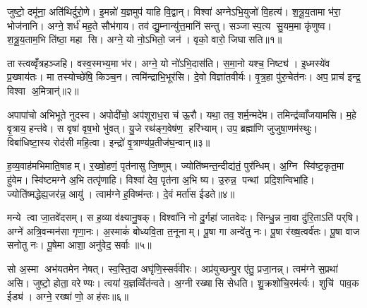 

\clearpage
{}
\setcounter{anuvakam}{0}
जुष्टो॒ दमू॑ना॒ अति॑थिर्दुरो॒णे। इ॒मन्नो॑ य॒ज्ञमुप॑ याहि वि॒द्वान्। विश्वा॑ अग्नेऽभि॒युजो॑ वि॒हत्य॑। श॒त्रू॒य॒तामा भ॑रा॒ भोज॑नानि। अग्ने॒ शर्ध॑ मह॒ते सौभ॑गाय। तव॑ द्यु॒म्नान्यु॑त्त॒मानि॑ सन्तु। सञ्जास्प॒त्य सु॒यम॒मा कृ॑णुष्व। श॒त्रू॒य॒ताम॒भि ति॑ष्ठा॒ महा सि। अग्ने॒ यो नो॒ऽभितो॒ जन॑। वृको॒ वारो॒ जिघासति॥१॥

तास्त्वव्वृँ॑त्रहञ्जहि। वस्व॒स्मभ्य॒मा भ॑र। अग्ने॒ यो नो॑ऽभि॒दास॑ति। स॒मा॒नो यश्च॒ निष्ट्य॑। इ॒ध्मस्ये॑व प्र॒ख्षाय॑तः। मा तस्योच्छे॑षि॒ किञ्च॒न। त्वमि॑न्द्राभि॒भूर॑सि। दे॒वो विज्ञा॑तवीर्यः। वृ॒त्र॒हा पु॑रु॒चेत॑नः। अप॒ प्राच॑ इन्द्र॒ विश्वा अ॒मित्रान्॑॥२॥

अपापा॑चो अभिभूते नुदस्व। अपोदी॑चो॒ अप॑शूराध॒रा च॑ ऊ॒रौ। यथा॒ तव॒ शर्म॒न्मदे॑म। तमिन्द्र॑व्वाँजयामसि। म॒हे वृ॒त्राय॒ हन्त॑वे। स वृषा॑ वृष॒भो भु॑वत्। यु॒जे रथ॑ङ्ग॒वेष॑ण॒ हरि॑भ्याम्। उप॒ ब्रह्मा॑णि जुजुषा॒णम॑स्थुः। विबा॑धिष्टा॒स्य रोद॑सी महि॒त्वा। इन्द्रो॑ वृ॒त्राण्य॑प्र॒तीज॑घ॒न्वान्॥३॥

ह॒व्य॒वाह॑मभिमाति॒षाहम्। र॒ख्षो॒हणं॒ पृत॑नासु जि॒ष्णुम्। ज्योति॑ष्मन्त॒न्दीद्य॑तं॒ पुर॑न्धिम्। अ॒ग्नि स्वि॑ष्ट॒कृत॒मा हु॑वेम। स्वि॑ष्टमग्ने अ॒भि तत्पृ॑णाहि। विश्वा॑ देव॒ पृत॑ना अ॒भि ष्य। उ॒रुन्न॒ पन्थां प्रदि॒शन्विभा॑हि। ज्योति॑ष्मद्धेह्य॒जर॑न्न॒ आयु॑। त्वाम॑ग्ने ह॒विष्म॑न्तः। दे॒वं मर्ता॑स ईडते॥४॥

मन्ये त्वा जा॒तवे॑दसम्। स ह॒व्या व॑क्ष्यानु॒षक्। विश्वा॑नि नो दु॒र्गहा॑ जातवेदः। सिन्धु॒न्न ना॒वा दु॑रि॒ताऽति॑ पर्‌षि। अग्ने॑ अत्रि॒वन्मन॑सा गृणा॒नः। अ॒स्माकं॑ बोध्यवि॒ता त॒नूनाम्। पू॒षा गा अन्वे॑तु नः। पू॒षा र॑ख्ष॒त्वर्व॑तः। पू॒षा वाज सनोतु नः। पू॒षेमा आशा॒ अनु॑वेद॒ सर्वाः॥५॥

सो अ॒स्मा अभ॑यतमेन नेषत्। स्व॒स्ति॒दा अघृ॑णि॒स्सर्व॑वीरः। अप्र॑युच्छन्पु॒र ए॑तु॒ प्रजा॒नन्न्। त्वम॑ग्ने स॒प्रथा॑ असि। जुष्टो॒ होता॒ वरेण्यः। त्वया॑ य॒ज्ञव्विँत॑न्वते। अ॒ग्नी रख्षासि सेधति। शु॒क्रशो॑चि॒रम॑र्त्यः। शुचि॑ पाव॒क ईड्य॑। अग्ने॒ रख्षा॑ णो॒ अह॑सः॥६॥

